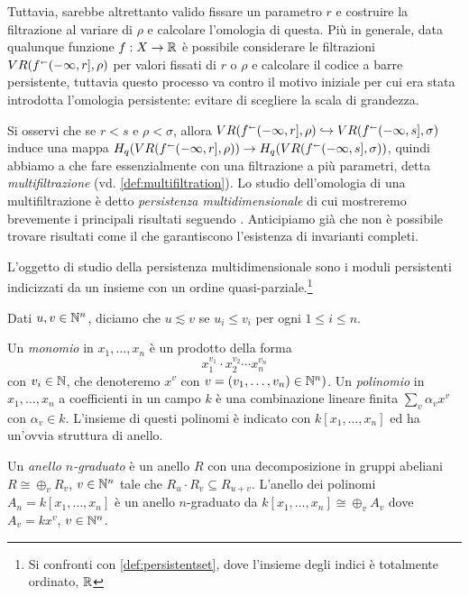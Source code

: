 Tuttavia, sarebbe altrettanto valido fissare un parametro $r$ e costruire la filtrazione al variare di $\rho$ e calcolare l'omologia di questa. Più in generale, data qualunque funzione $f:X\to \mathbb{R}$ è possibile considerare le filtrazioni $VR(f^\shortleftarrow(-\infty,r],\rho)$ per valori fissati di $r$ o $\rho$ e calcolare il codice a barre persistente, tuttavia questo processo va contro il motivo iniziale per cui era stata introdotta l'omologia persistente: evitare di scegliere la scala di grandezza.

Si osservi che se $r<s$ e $\rho<\sigma$, allora
$VR(f^\shortleftarrow(-\infty,r],\rho)\hookrightarrow VR(f^\shortleftarrow(-\infty,s],\sigma)$ induce
una mappa $H_q(VR(f^\shortleftarrow(-\infty,r],\rho))\to H_q(VR(f^\shortleftarrow(-\infty,s],\sigma))$, quindi abbiamo a che fare essenzialmente con una filtrazione a più parametri, detta \emph{multifiltrazione} (vd. \cref{def:multifiltration}). Lo studio dell'omologia di una multifiltrazione è detto \emph{persistenza multidimensionale} di cui mostreremo brevemente i principali risultati seguendo \cite{Carlsson2009a}.
Anticipiamo già che non è possibile trovare risultati come il  che garantiscono l'esistenza di invarianti completi.

L'oggetto di studio della persistenza multidimensionale sono i moduli persistenti indicizzati da un insieme con un ordine quasi-parziale.\footnote{Si confronti con \cref{def:persistentset}, dove l'insieme degli indici è totalmente ordinato, $\mathbb{R}$}

Dati $u,v\in\mathbb{N}^n$, diciamo che $u\lesssim v$ se $u_i \leq v_i$ per ogni $1\leq i\leq n$.

Un \emph{monomio} in $x_1,\dots,x_n$ è un prodotto della forma
\begin{equation*}
  x_1^{v_1}\cdot x_2^{v_2} \cdots x_n^{v_n}
\end{equation*}
con $v_i\in\mathbb{N}$, che denoteremo $x^v$ con $v=(v_1,\dots,v_n)\in\mathbb{N}^n)$. Un \emph{polinomio} in $x_1,\dots,x_n$ a coefficienti in un campo $k$ è una combinazione lineare finita $\sum_v \alpha_v x^v$ con $\alpha_v\in k$. L'insieme di questi polinomi è indicato con $k[x_1,\dots,x_n]$ ed ha un'ovvia struttura di anello.

Un \emph{anello $n$-graduato} è un anello $R$ con una decomposizione in gruppi abeliani $R\cong \oplus_v R_v$, $v\in\mathbb{N}^n$ tale che $R_u\cdot R_v\subseteq R_{u+v}$. L'anello dei polinomi $A_n = k[x_1,\dots,x_n]$ è un anello $n$-graduato da
$k[x_1,\dots,x_n]\cong \oplus_v A_v$ dove $A_v= kx^v$, $v\in\mathbb{N}^n$.

